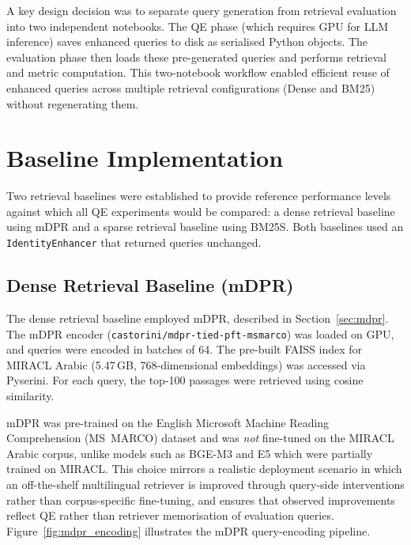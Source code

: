 A key design decision was to separate query generation from retrieval evaluation into two independent notebooks. The QE phase (which requires GPU for LLM inference) saves enhanced queries to disk as serialised Python objects. The evaluation phase then loads these pre-generated queries and performs retrieval and metric computation. This two-notebook workflow enabled efficient reuse of enhanced queries across multiple retrieval configurations (Dense and BM25) without regenerating them.

\section{Baseline Implementation}
\label{sec:meth_baseline}

Two retrieval baselines were established to provide reference performance levels against which all QE experiments would be compared: a dense retrieval baseline using mDPR and a sparse retrieval baseline using BM25S. Both baselines used an \texttt{IdentityEnhancer} that returned queries unchanged.

\subsection{Dense Retrieval Baseline (mDPR)}
\label{sec:meth_dense_baseline}

The dense retrieval baseline employed mDPR, described in Section~\ref{sec:mdpr}. The mDPR encoder (\texttt{castorini/mdpr-tied-pft-msmarco}) was loaded on GPU, and queries were encoded in batches of 64. The pre-built FAISS index for MIRACL Arabic (5.47\,GB, 768-dimensional embeddings) was accessed via Pyserini. For each query, the top-100 passages were retrieved using cosine similarity.

mDPR was pre-trained on the English Microsoft Machine Reading Comprehension (MS~MARCO) dataset and was \emph{not} fine-tuned on the MIRACL Arabic corpus, unlike models such as BGE-M3 and E5 which were partially trained on MIRACL. This choice mirrors a realistic deployment scenario in which an off-the-shelf multilingual retriever is improved through query-side interventions rather than corpus-specific fine-tuning, and ensures that observed improvements reflect QE rather than retriever memorisation of evaluation queries. Figure~\ref{fig:mdpr_encoding} illustrates the mDPR query-encoding pipeline.

